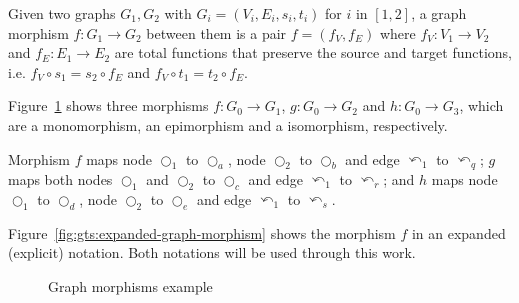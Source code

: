 \begin{definition}\label{def:graph-morphism} Given two graphs $G_1,G_2$ with \mbox{$G_i = \left(V_i, E_i, s_i, t_i\right)$} for $i$ in $[1,2]$, a graph morphism $f : G_1 \rightarrow G_2$ between them is a pair $f = \left(f_V,f_E\right)$ where $f_V : V_1 \rightarrow V_2$ and $f_E : E_1 \rightarrow E_2$ are total functions that preserve the source and target functions, i.e. $f_V \circ s_1 = s_2 \circ f_E$ and $f_V \circ t_1 = t_2 \circ f_E$.
\end{definition}

\begin{example}Figure~\ref{fig:gts:compact-graph-morphism} shows three morphisms $f : G_0 \rightarrow G_1$, $g : G_0 \rightarrow G_2$ and $h : G_0 \rightarrow G_3$, which are a monomorphism, an epimorphism and a isomorphism, respectively.

  Morphism $f$ maps node $\Circle_1$ to $\Circle_a$, node $\Circle_2$ to $\Circle_b$ and edge $\curvearrowleft_1$ to $\curvearrowleft_q$; $g$ maps both nodes $\Circle_1$ and $\Circle_2$ to $\Circle_c$ and edge $\curvearrowleft_1$ to $\curvearrowleft_r$; and $h$ maps node $\Circle_1$ to $\Circle_d$, node $\Circle_2$ to $\Circle_e$ and edge $\curvearrowleft_1$ to $\curvearrowleft_s$.

  Figure~\ref{fig:gts:expanded-graph-morphism} shows the morphism $f$ in an expanded (explicit) notation. Both notations will be used through this work.
\begin{figure}[!ht]
  \centering
  \caption{Graph morphisms example}\label{fig:gts:compact-graph-morphism}
\end{figure}


\end{example}
